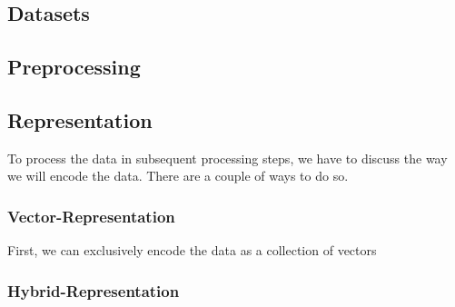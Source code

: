\documentclass[./../../paper.tex]{subfiles}
\begin{document}
\subsection{Datasets}
\label{sec:dataset_description}

\subsection{Preprocessing}
\label{sec:preprocessing}

\subsection{Representation}
\label{sec:representation}
To process the data in subsequent processing steps, we have to discuss the way we will encode the data. There are a couple of ways to do so. 

\subsubsection{Vector-Representation}
First, we can exclusively encode the data as a collection of vectors
\subsubsection{Hybrid-Representation}
\end{document}
